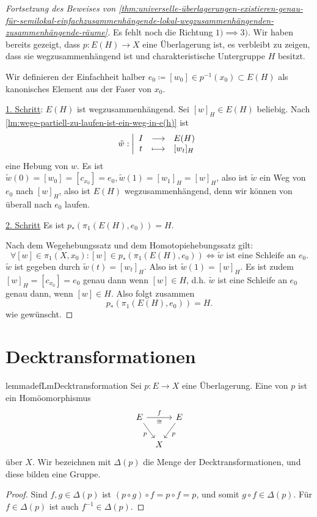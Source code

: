 \begin{proof}[Fortsetzung des Beweises von \autoref{thm:universelle-überlagerungen-existieren-genau-für-semilokal-einfachzusammenhängende-lokal-wegzusammenhängenden-zusammenhängende-räume}]
    Es fehlt noch die Richtung $1) \implies 3)$.  Wir haben bereits gezeigt, dass $p\colon  E(H) \to  X$ eine Überlagerung ist, es verbleibt zu zeigen, dass sie wegzusammenhängend ist und charakteristische Untergruppe $H$ besitzt.

    Wir definieren der Einfachheit halber $e_0\coloneqq [w_{0}]\in p^{-1} (x_0) \subset E(H)$ als kanonisches Element aus der Faser von $x_0$.

    \underline{1. Schritt}: $E(H)$ ist wegzusammenhängend. Sei  $[w]_H \in E(H)$ beliebig. Nach \autoref{lm:wege-partiell-zu-laufen-ist-ein-weg-in-e(h)} ist
        \begin{equation*}
        \tilde{w}: \left| \begin{array}{c c l} 
            I & \longrightarrow & E(H) \\
            t & \longmapsto &  [w_t]_H
        \end{array} \right.
    \end{equation*}
    eine Hebung von $w$. Es ist  $\tilde{w}(0) = [w_0] = [c_{x_0}] = e_0, \tilde{w}(1) = [w_1]_H = [w]_H$, also ist $\tilde{w}$ ein Weg von $e_0$ nach $[w]_H$, also ist  $E(H)$ wegzusammenhängend, denn wir können von überall nach  $e_0$ laufen.

    \underline{2. Schritt} Es ist $p_*(\pi_1(E(H),e_0)) = H$.

    Nach dem Wegehebungssatz und dem Homotopiehebungssatz gilt:
    \[
        \forall [w] \in \pi_1(X,x_0) \colon  [w] \in p_*(\pi_1(E(H),e_0)) \iff  \tilde{w} \text{ ist eine Schleife an $e_0$}
    .\] 
    $\tilde{w}$ ist gegeben durch  $\tilde{w}(t) = [w_t]_H$. Also ist $\tilde{w}(1) = [w]_H$. Es ist zudem $[w]_H = [c_{x_0}] = e_0$ genau dann wenn $[w]\in H$, d.h. $\tilde{w}$ ist eine Schleife an $e_0$ genau dann, wenn $[w] \in H$. Also folgt zusammen
    \[
        p_*(\pi_1(E(H),e_0)) = H
    .\] 
    wie gewünscht.
\end{proof}

\section{Decktransformationen}
\begin{restatable}[Decktransformation]{lemmadef}{LmDecktransformation}\label{def:decktransformation}
    Sei $p\colon  E \to  X$ eine Überlagerung. Eine  von $p$ ist ein Homöomorphismus
     \[
         \begin{tikzcd}[column sep = tiny, ampersand replacement = \&]
        E \ar{rr}{f}[swap]{\cong} \ar[swap]{dr}{p} \& \& E \ar{dl}{p} \\
    \& X
    \end{tikzcd}
    \]
    über $X$.  Wir bezeichnen mit  $\Delta(p)$ die Menge der Decktransformationen, und diese bilden eine Gruppe.
\end{restatable}

\begin{proof}
    Sind $f,g\in \Delta(p)$ ist $(p \circ  g) \circ  f = p \circ  f = p$, und somit $g \circ  f \in \Delta(p)$. Für $f\in \Delta(p)$ ist auch $f^{-1}\in \Delta(p)$.
\end{proof}

